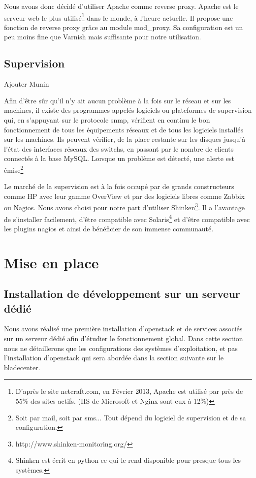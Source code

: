 \documentclass[a4paper,oneside]{report}
\begin{document}
Nous avons donc décidé d'utiliser Apache comme reverse proxy. Apache est le serveur web le plus utilisé\footnote{D'après le site netcraft.com, en Février 2013, Apache est utilisé par près de 55\% des sites actifs. (IIS de Microsoft et Nginx sont eux à 12\%)} dans le monde, à l'heure actuelle.
Il propose une fonction de reverse proxy grâce au module mod\_proxy. Sa configuration est un peu moins fine que Varnish mais suffisante pour notre utilisation.

\section{Supervision}

Ajouter Munin

Afin d'être sûr qu'il n'y ait aucun problème à la fois sur le réseau et sur les machines, il existe des programmes appelés logiciels ou plateformes de supervision qui, en s'appuyant sur le protocole snmp, vérifient en continu le bon fonctionnement de tous les équipements réseaux et de tous les logiciels installés sur les machines.
Ils peuvent vérifier, de la place restante sur les disques jusqu'à l'état des interfaces réseaux des switchs, en passant par le nombre de clients connectés à la base MySQL.
Lorsque un problème est détecté, une alerte est émise\footnote{Soit par mail, soit par sms... Tout dépend du logiciel de supervision et de sa configuration.}

Le marché de la supervision est à la fois occupé par de grands constructeurs comme HP avec leur gamme OverView et par des logiciels libres comme Zabbix ou Nagios.
Nous avons choisi pour notre part d'utiliser Shinken\footnote{http://www.shinken-monitoring.org/}.
Il a l'avantage de s'installer facilement, d'être compatible avec Solaris\footnote{Shinken est écrit en python ce qui le rend disponible pour presque tous les systèmes.} et d'être compatible avec les plugins nagios et ainsi de bénéficier de son immense communauté.



\chapter{Mise en place} \label{cha:miseenplace}
\section{Installation de développement sur un serveur dédié}
Nous avons réalisé une première installation d'\gls{openstack} et de services associés sur un serveur dédié afin d'étudier le fonctionnement global.
Dans cette section nous ne détaillerons que les configurations des systèmes d'exploitation, et pas l'installation d'\gls{openstack} qui sera abordée dans la section suivante sur le \gls{bladecenter}.
\end{document}
